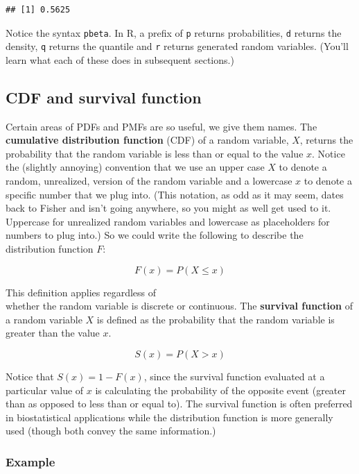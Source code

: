 \documentclass[]{article}
\begin{document}
\begin{verbatim}
## [1] 0.5625
\end{verbatim}

Notice the syntax \texttt{pbeta}. In R, a prefix of \texttt{p} returns
probabilities, \texttt{d} returns the density, \texttt{q} returns the
quantile and \texttt{r} returns generated random variables. (You'll
learn what each of these does in subsequent sections.)

\subsection{CDF and survival function}\label{cdf-and-survival-function}

Certain areas of PDFs and PMFs are so useful, we give them names. The
\textbf{cumulative distribution function} (CDF) of a random variable,
$X$, returns the probability that the random variable is less than or
equal to the value $x$. Notice the (slightly annoying) convention that
we use an upper case $X$ to denote a random, unrealized, version of the
random variable and a lowercase $x$ to denote a specific number that we
plug into. (This notation, as odd as it may seem, dates back to Fisher
and isn't going anywhere, so you might as well get used to it. Uppercase
for unrealized random variables and lowercase as placeholders for
numbers to plug into.) So we could write the following to describe the
distribution function $F$:

\[
F(x) = P(X \leq x)
\]

This definition applies regardless of\\whether the random variable is
discrete or continuous. The \textbf{survival function} of a random
variable $X$ is defined as the probability that the random variable is
greater than the value $x$.

\[
S(x) = P(X > x)
\]

Notice that $S(x) = 1 - F(x)$, since the survival function evaluated at
a particular value of $x$ is calculating the probability of the opposite
event (greater than as opposed to less than or equal to). The survival
function is often preferred in biostatistical applications while the
distribution function is more generally used (though both convey the
same information.)

\subsubsection{Example}\label{example-2}
\end{document}
